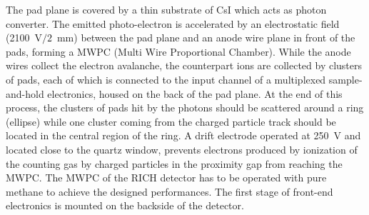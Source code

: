 The pad plane
 is covered by a thin substrate of CsI which
acts as photon converter. The emitted photo-electron is
accelerated by an electrostatic field (2100~V$/2$~mm) 
between the pad plane and
an anode wire plane in front of the pads,
 forming a MWPC (Multi Wire Proportional Chamber). 
While the anode wires collect the electron avalanche, the counterpart 
ions are collected by clusters of pads, each of which is connected to the
input channel of a multiplexed sample-and-hold electronics, housed on the
back of the pad plane.
At the end of this process, the
clusters of pads hit by the photons should be
scattered around a ring (ellipse) while 
one cluster coming from the charged particle track
should be located in the central region of the ring.
A drift electrode operated at 250~V and located close to the quartz window,
prevents electrons produced by ionization of the counting gas by charged 
particles in the proximity gap from reaching the MWPC. The MWPC of the RICH detector 
has to be operated with pure methane to achieve the 
designed performances. The first stage of front-end electronics is mounted on the 
backside of the detector. 

